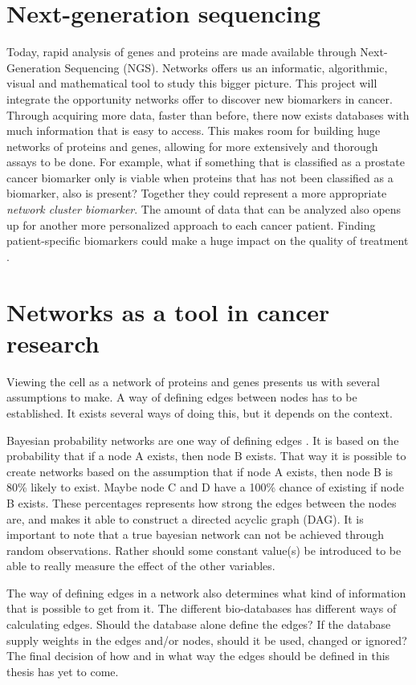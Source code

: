 \section{Next-generation sequencing}
Today, rapid analysis of genes and proteins are made available through
Next-Generation Sequencing (NGS)\cite{ngs1}. Networks offers us an informatic,
algorithmic, visual and mathematical tool to study this bigger picture. This
project will integrate the opportunity networks offer to discover new biomarkers
in cancer. Through acquiring more data, faster than before, there now exists
databases with much information that is easy to access. This makes room for
building huge networks of proteins and genes, allowing for more extensively and
thorough assays to be done. For example, what if something that is classified as
a prostate cancer biomarker only is viable when proteins that has not been
classified as a biomarker, also is present?  Together they could represent a
more appropriate \emph{network cluster biomarker}. The amount of data that can
be analyzed also opens up for another more personalized approach to each cancer
patient. Finding patient-specific biomarkers could make a huge impact on the
quality of treatment \cite{personalized}.  

\section{Networks as a tool in cancer research}
Viewing the cell as a network of proteins and genes presents us with several
assumptions to make. A way of defining edges between nodes has to be
established. It exists several ways of doing this, but it depends on the
context.

Bayesian probability networks are one way of defining edges
\cite{bayesiannetworks}. It is based on the probability that if a node A exists,
then node B exists. That way it is possible to create networks based on the
assumption that if node A exists, then node B is 80\% likely to exist. Maybe
node C and D have a 100\% chance of existing if node B exists.  These
percentages represents how strong the edges between the nodes are, and makes it
able to construct a directed acyclic graph (DAG). It is important to note that a
true bayesian network can not be achieved through random observations. Rather
should some constant value(s) be introduced to be able to really measure the
effect of the other variables.

The way of defining edges in a network also determines what kind of information
that is possible to get from it. The different bio-databases has different ways
of calculating edges. Should the database alone define the edges? If the
database supply weights in the edges and/or nodes, should it be used, changed or
ignored? The final decision of how and in what way the edges should be defined
in this thesis has yet to come. 

